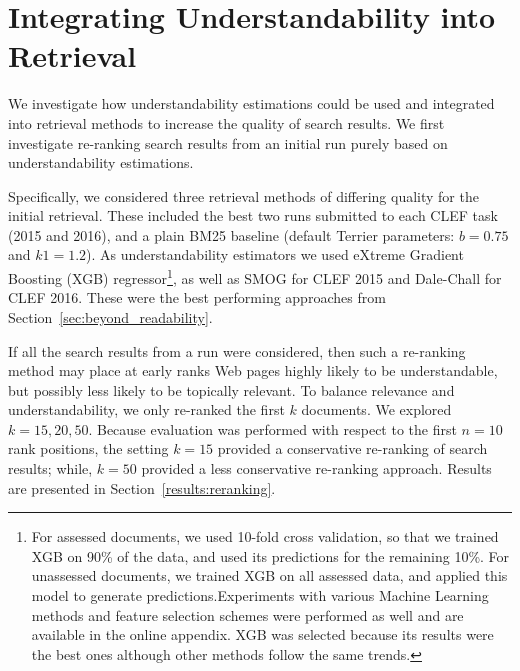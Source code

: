 \section{Integrating Understandability into Retrieval}
\label{sec:experiments}

We investigate how understandability estimations could be used and integrated into retrieval methods to increase the quality of search results. We first investigate re-ranking search results from an initial run purely based on understandability estimations. 

Specifically, we considered three retrieval methods of differing quality for the initial retrieval. These included the best two runs submitted to each CLEF task (2015 and 2016), and a plain BM25 baseline (default Terrier parameters: $b=0.75$ and $k1=1.2$). As understandability estimators we used eXtreme Gradient Boosting (XGB) regressor\footnote{For assessed documents, we used 10-fold cross validation, so that we trained XGB on 90\% of the data, and used its predictions for the remaining 10\%. For unassessed documents, we trained XGB on all assessed data, and applied this model to generate predictions.Experiments with various Machine Learning methods and feature selection schemes were performed as well and are available in the online appendix. XGB was selected because its results were the best ones although other methods follow the same trends.}\cite{chen16}, as well as SMOG for CLEF 2015 and Dale-Chall for CLEF 2016. These were the best performing approaches from Section~\ref{sec:beyond_readability}.

If all the search results from a run were considered, then such a re-ranking method may place at early ranks Web pages highly likely to be understandable, but possibly less likely to be topically relevant. To balance relevance and understandability, we only re-ranked the first $k$ documents. We explored $k = 15, 20, 50$. Because evaluation was performed with respect to the first $n=10$ rank positions, the setting $k=15$ provided a conservative re-ranking of search results; while, $k=50$ provided a less conservative re-ranking approach. Results are presented in Section~\ref{results:reranking}.

